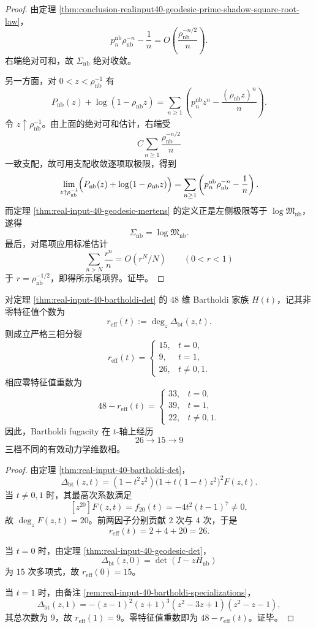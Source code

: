\begin{proof}
由定理 \ref{thm:conclusion-realinput40-geodesic-prime-shadow-square-root-law}，
\[
p_n^{\mathrm{nb}}\rho_{\mathrm{nb}}^{-n}-\frac1n
=
O\!\left(\frac{\rho_{\mathrm{nb}}^{-n/2}}{n}\right).
\]
右端绝对可和，故 \(\Sigma_{\mathrm{nb}}\) 绝对收敛。

另一方面，对 \(0<z<\rho_{\mathrm{nb}}^{-1}\) 有
\[
P_{\mathrm{nb}}(z)+\log(1-\rho_{\mathrm{nb}}z)
=
\sum_{n\ge 1}
\left(
p_n^{\mathrm{nb}}z^n-\frac{(\rho_{\mathrm{nb}}z)^n}{n}
\right).
\]
令 \(z\uparrow \rho_{\mathrm{nb}}^{-1}\)。由上面的绝对可和估计，右端受
\[
C\sum_{n\ge 1}\frac{\rho_{\mathrm{nb}}^{-n/2}}{n}
\]
一致支配，故可用支配收敛逐项取极限，得到
\[
\lim_{z\uparrow \rho_{\mathrm{nb}}^{-1}}
\Bigl(
P_{\mathrm{nb}}(z)+\log(1-\rho_{\mathrm{nb}}z)
\Bigr)
=
\sum_{n\ge 1}\left(p_n^{\mathrm{nb}}\rho_{\mathrm{nb}}^{-n}-\frac1n\right).
\]
而定理 \ref{thm:real-input-40-geodesic-mertens} 的定义正是左侧极限等于 \(\log\mathfrak M_{\mathrm{nb}}\)，遂得
\[
\Sigma_{\mathrm{nb}}=\log\mathfrak M_{\mathrm{nb}}.
\]
最后，对尾项应用标准估计
\[
\sum_{n>N}\frac{r^n}{n}=O(r^N/N)\qquad(0<r<1)
\]
于 \(r=\rho_{\mathrm{nb}}^{-1/2}\)，即得所示尾项界。证毕。
\end{proof}
\begin{theorem}\label{thm:conclusion-realinput40-bartholdi-effective-dimension-trichotomy}
对定理 \ref{thm:real-input-40-bartholdi-det} 的 \(48\) 维 Bartholdi 家族 \(H(t)\)，记其非零特征值个数为
\[
r_{\mathrm{eff}}(t):=\deg_z \Delta_{\mathrm{bt}}(z,t).
\]
则成立严格三相分裂
\[
r_{\mathrm{eff}}(t)=
\begin{cases}
15,& t=0,\\
9,& t=1,\\
26,& t\neq 0,1.
\end{cases}
\]
相应零特征值重数为
\[
48-r_{\mathrm{eff}}(t)=
\begin{cases}
33,& t=0,\\
39,& t=1,\\
22,& t\neq 0,1.
\end{cases}
\]
因此，Bartholdi fugacity 在 \(t\)-轴上经历
\[
26\longrightarrow 15\longrightarrow 9
\]
三档不同的有效动力学维数相。
\end{theorem}
\begin{proof}
由定理 \ref{thm:real-input-40-bartholdi-det}，
\[
\Delta_{\mathrm{bt}}(z,t)=(1-t^2z^2)\bigl(1+t(1-t)z^2\bigr)^2F(z,t).
\]
当 \(t\neq 0,1\) 时，其最高次系数满足
\[
[z^{20}]F(z,t)=f_{20}(t)=-4t^2(t-1)^7\neq 0,
\]
故 \(\deg_zF(z,t)=20\)。前两因子分别贡献 \(2\) 次与 \(4\) 次，于是
\[
r_{\mathrm{eff}}(t)=2+4+20=26.
\]

当 \(t=0\) 时，由定理 \ref{thm:real-input-40-geodesic-det}，
\[
\Delta_{\mathrm{bt}}(z,0)=\det(I-zH_{\mathrm{nb}})
\]
为 \(15\) 次多项式，故 \(r_{\mathrm{eff}}(0)=15\)。

当 \(t=1\) 时，由备注 \ref{rem:real-input-40-bartholdi-specializations}，
\[
\Delta_{\mathrm{bt}}(z,1)=-(z-1)^2(z+1)^3(z^2-3z+1)(z^2-z-1),
\]
其总次数为 \(9\)，故 \(r_{\mathrm{eff}}(1)=9\)。零特征值重数即为 \(48-r_{\mathrm{eff}}(t)\)。证毕。
\end{proof}
